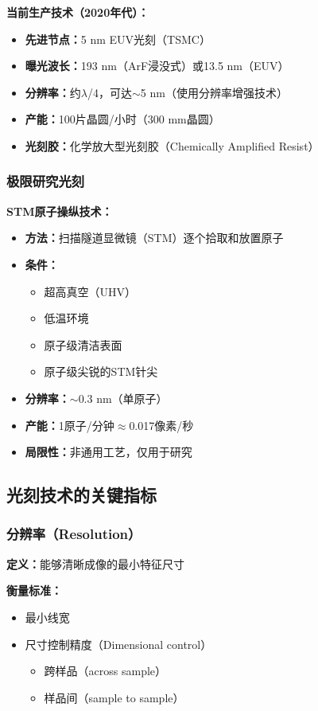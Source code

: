 \documentclass[UTF8,12pt,a4paper]{ctexart}
\begin{document}
\textbf{当前生产技术（2020年代）：}
\begin{itemize}
    \item \textbf{先进节点：}5 nm EUV光刻（TSMC）
    \item \textbf{曝光波长：}193 nm（ArF浸没式）或13.5 nm（EUV）
    \item \textbf{分辨率：}约$\lambda$/4，可达$\sim$5 nm（使用分辨率增强技术）
    \item \textbf{产能：}100片晶圆/小时（300 mm晶圆）
    \item \textbf{光刻胶：}化学放大型光刻胶（Chemically Amplified Resist）
\end{itemize}

\subsubsection{极限研究光刻}

\textbf{STM原子操纵技术：}
\begin{itemize}
    \item \textbf{方法：}扫描隧道显微镜（STM）逐个拾取和放置原子
    \item \textbf{条件：}
    \begin{itemize}
        \item 超高真空（UHV）
        \item 低温环境
        \item 原子级清洁表面
        \item 原子级尖锐的STM针尖
    \end{itemize}
    \item \textbf{分辨率：}$\sim$0.3 nm（单原子）
    \item \textbf{产能：}1原子/分钟$\approx$0.017像素/秒
    \item \textbf{局限性：}非通用工艺，仅用于研究
\end{itemize}

\subsection{光刻技术的关键指标}

\subsubsection{分辨率（Resolution）}

\textbf{定义：}能够清晰成像的最小特征尺寸

\textbf{衡量标准：}
\begin{itemize}
    \item 最小线宽
    \item 尺寸控制精度（Dimensional control）
    \begin{itemize}
        \item 跨样品（across sample）
        \item 样品间（sample to sample）
    \end{itemize}
\end{itemize}
\end{document}
